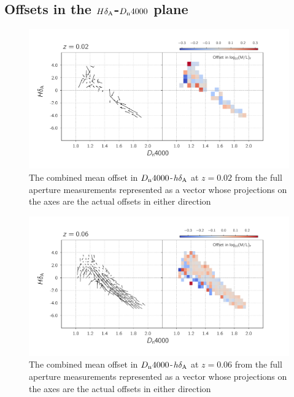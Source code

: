 \subsection{Offsets in the $H\delta_{\rm A}$-$D_{\rm n}4000$ plane}

\begin{figure}
\includegraphics[width=\textwidth]{figures/mlz_offset_a.pdf}
\caption[ The combined mean offset in $D_{\rm n}4000$-$h\delta_{\rm A}$ at $z=0.02$ from the full aperture measurements represented as a vector whose projections on the axes are the actual offsets in either direction ]{ The combined mean offset in $D_{\rm n}4000$-$h\delta_{\rm A}$ at $z=0.02$ from the full aperture measurements represented as a vector whose projections on the axes are the actual offsets in either direction
\label{fig:offset_quiver1}}
\end{figure}


\begin{figure}
\includegraphics[width=\textwidth]{figures/mlz_offset_b.pdf}
\caption[ The combined mean offset in $D_{\rm n}4000$-$h\delta_{\rm A}$ at $z=0.06$ from the full aperture measurements represented as a vector whose projections on the axes are the actual offsets in either direction ]{ The combined mean offset in $D_{\rm n}4000$-$h\delta_{\rm A}$ at $z=0.06$ from the full aperture measurements represented as a vector whose projections on the axes are the actual offsets in either direction
\label{fig:offset_quiver2}}
\end{figure}

